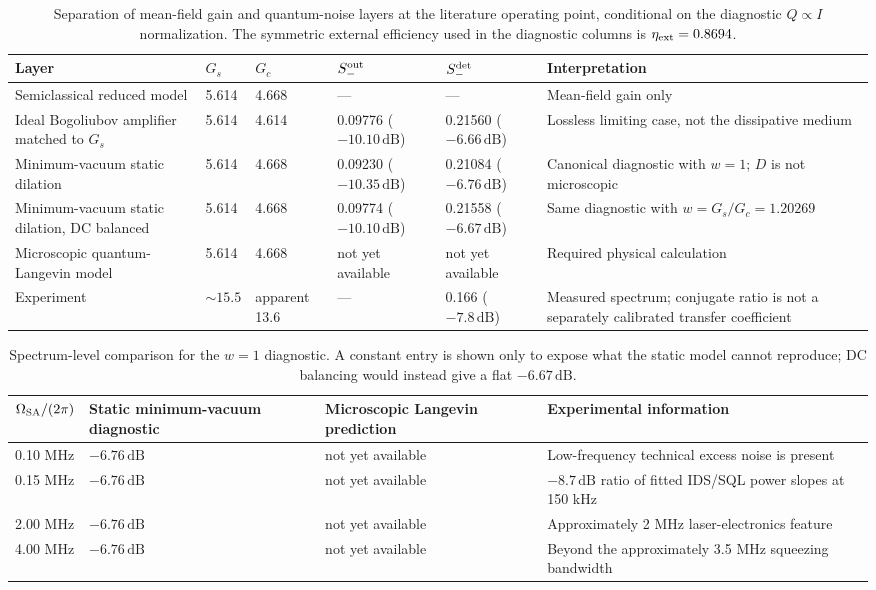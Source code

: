 \documentclass[11pt,a4paper]{article}
\newcommand{\dB}{\,\mathrm{dB}}
\newcommand{\pending}{\textcolor{amber}{not yet available}}
\begin{document}
\begin{table}[ht]
\centering
\caption{Separation of mean-field gain and quantum-noise layers at the
literature operating point, conditional on the diagnostic $Q\propto I$
normalization. The symmetric external efficiency used in the diagnostic
columns is $\eta_{\rm ext}=0.8694$.}
\label{tab:model-layer-comparison}
\small
\begin{tabularx}{\textwidth}{L{3.7cm}C{1.35cm}C{1.35cm}C{1.8cm}C{1.8cm}Y}
\toprule
Layer & $G_s$ & $G_c$ & $S_-^{\rm out}$ & $S_-^{\rm det}$ &
Interpretation\\
\midrule
Semiclassical reduced model & 5.614 & 4.668 & --- & --- &
Mean-field gain only\\
Ideal Bogoliubov amplifier matched to $G_s$ & 5.614 & 4.614 &
0.09776 ($-10.10\dB$) & 0.21560 ($-6.66\dB$) &
Lossless limiting case, not the dissipative medium\\
Minimum-vacuum static dilation & 5.614 & 4.668 &
0.09230 ($-10.35\dB$) & 0.21084 ($-6.76\dB$) &
Canonical diagnostic with $w=1$; $D$ is not microscopic\\
Minimum-vacuum static dilation, DC balanced & 5.614 & 4.668 &
0.09774 ($-10.10\dB$) & 0.21558 ($-6.67\dB$) &
Same diagnostic with $w=G_s/G_c=1.20269$\\
Microscopic quantum-Langevin model & 5.614 & 4.668 &
\pending & \pending & Required physical calculation\\
Experiment & $\sim15.5$ & apparent 13.6 & --- &
0.166 ($-7.8\dB$) & Measured spectrum; conjugate ratio is not a separately
calibrated transfer coefficient\\
\bottomrule
\end{tabularx}
\end{table}

\begin{table}[ht]
\centering
\caption{Spectrum-level comparison for the $w=1$ diagnostic. A constant entry
is shown only to expose what the static model cannot reproduce; DC balancing
would instead give a flat $-6.67\dB$.}
\label{tab:spectrum-comparison}
\small
\begin{tabularx}{\textwidth}{C{2.1cm}C{2.6cm}C{2.9cm}Y}
\toprule
$\Omega_{\rm SA}/(2\pi)$ &
Static minimum-vacuum diagnostic &
Microscopic Langevin prediction & Experimental information\\
 MHz & $-6.76\dB$ & \pending &
Low-frequency technical excess noise is present\\
0.15 MHz & $-6.76\dB$ & \pending &
$-8.7\dB$ ratio of fitted IDS/SQL power slopes at 150 kHz\\
2.00 MHz & $-6.76\dB$ & \pending &
Approximately 2 MHz laser-electronics feature\\
4.00 MHz & $-6.76\dB$ & \pending &
Beyond the approximately 3.5 MHz squeezing bandwidth\\
\bottomrule
\end{tabularx}
\end{table}
\end{document}
